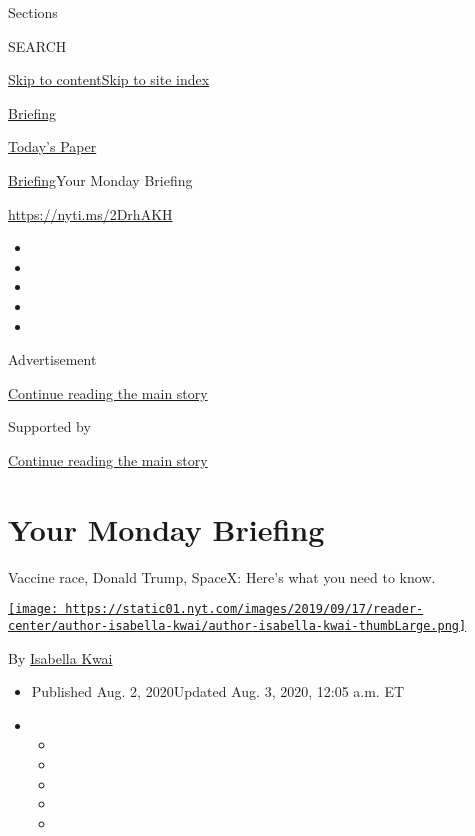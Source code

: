 Sections

SEARCH

\protect\hyperlink{site-content}{Skip to
content}\protect\hyperlink{site-index}{Skip to site index}

\href{https://www.nytimes.com/interactive/2018/briefing/global-morning-briefing-newsletter-signup.html}{Briefing}

\href{https://myaccount.nytimes.com/auth/login?response_type=cookie\&client_id=vi}{}

\href{https://www.nytimes.com/section/todayspaper}{Today's Paper}

\href{/interactive/2018/briefing/global-morning-briefing-newsletter-signup.html}{Briefing}\textbar{}Your
Monday Briefing

\url{https://nyti.ms/2DrhAKH}

\begin{itemize}
\item
\item
\item
\item
\item
\end{itemize}

Advertisement

\protect\hyperlink{after-top}{Continue reading the main story}

Supported by

\protect\hyperlink{after-sponsor}{Continue reading the main story}

\hypertarget{your-monday-briefing}{%
\section{Your Monday Briefing}\label{your-monday-briefing}}

Vaccine race, Donald Trump, SpaceX: Here's what you need to know.

\href{https://www.nytimes.com/by/isabella-kwai}{\texttt{[image: https://static01.nyt.com/images/2019/09/17/reader-center/author-isabella-kwai/author-isabella-kwai-thumbLarge.png]}}

By \href{https://www.nytimes.com/by/isabella-kwai}{Isabella Kwai}

\begin{itemize}
\item
  Published Aug. 2, 2020Updated Aug. 3, 2020, 12:05 a.m. ET
\item
  \begin{itemize}
  \item
  \item
  \item
  \item
  \item
  \end{itemize}
\end{itemize}

